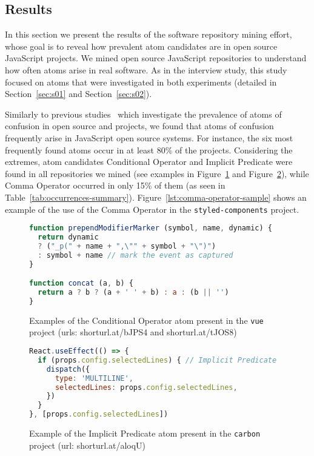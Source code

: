 \subsection{Results}
\label{sec:msr-results} 

In this section we present the results of the  software repository
mining effort, whose goal is to reveal how prevalent atom candidates are in open source JavaScript projects. 
We mined \minedprojects open source JavaScript repositories to understand how
often atoms arise in real software. As in the interview study, this study focused on atoms that were investigated in both
experiments (detailed in Section~\ref{sec:s01} and Section~\ref{sec:s02}).  


Similarly to previous studies~\cite{DBLP:conf/msr/GopsteinZFC18,DBLP:journals/ese/MedeirosLAAKRG19} which investigate
the prevalence of atoms of confusion in open source \clang and \cpplang projects, we found that atoms of confusion
frequently arise in JavaScript open source systems. For instance, the six most frequently found atoms
occur in at least 80\% of the projects. Considering the extremes, atom candidates Conditional Operator and
Implicit Predicate were found in all repositories we mined (see examples in Figure~\ref{lst:conditional-operator-sample}
and Figure~\ref{lst:implicit-predicate-sample}), while Comma Operator occurred in only 15\% of them (as seen in Table~\ref{tab:occurrences-summary}).
Figure~\ref{lst:comma-operator-sample} shows an example of the use of the Comma Operator in the \texttt{styled-components}
project.

\begin{figure}[htb]
  \begin{lstlisting}[language=JavaScript]
function prependModifierMarker (symbol, name, dynamic) {
  return dynamic
  ? ("_p(" + name + ",\"" + symbol + "\")")
  : symbol + name // mark the event as captured
}

function concat (a, b) {
  return a ? b ? (a + ' ' + b) : a : (b || '')
}
  \end{lstlisting}
  \caption{Examples of the Conditional Operator atom present in the \texttt{vue} project (urls: shorturl.at/bJPS4 and shorturl.at/tJOS8)}
   \label{lst:conditional-operator-sample}
\end{figure}

\begin{figure}[htb]
  \begin{lstlisting}[language=JavaScript]
React.useEffect(() => {
  if (props.config.selectedLines) { // Implicit Predicate
    dispatch({
      type: 'MULTILINE',
      selectedLines: props.config.selectedLines,
    })
  }
}, [props.config.selectedLines])
  \end{lstlisting}
  \caption{Example of the Implicit Predicate atom present in the \texttt{carbon} project (url: shorturl.at/aloqU)}
  \label{lst:implicit-predicate-sample}
\end{figure}

